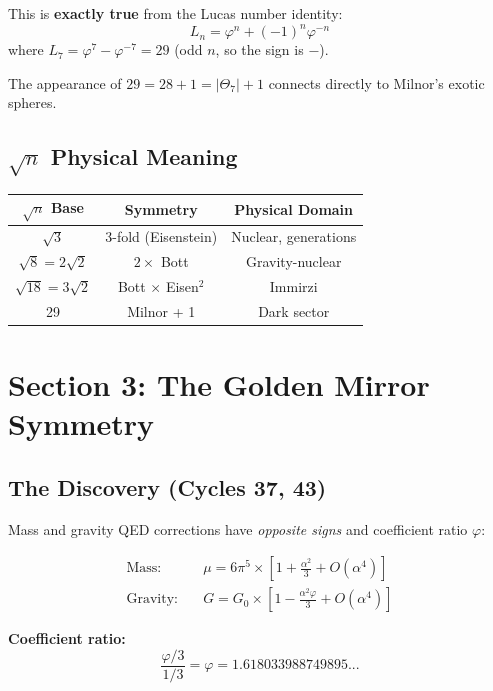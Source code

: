 \documentclass[aps,prd,twocolumn,superscriptaddress,floatfix,nofootinbib]{revtex4-2}
\theoremstyle{definition}
\theoremstyle{remark}
\newcommand{\vp}{\varphi}
\newcommand{\Th}{\Theta}
\begin{document}
This is \textbf{exactly true} from the Lucas number identity:
\begin{equation}
L_n = \vp^n + (-1)^n \vp^{-n}
\end{equation}
where $L_7 = \vp^7 - \vp^{-7} = 29$ (odd $n$, so the sign is $-$).

The appearance of $29 = 28 + 1 = |\Th_7| + 1$ connects directly to Milnor's exotic spheres.

\subsection{$\sqrt{n}$ Physical Meaning}

\begin{center}
\begin{tabular}{ccc}
\toprule
$\sqrt{n}$ Base & Symmetry & Physical Domain \\
\midrule
$\sqrt{3}$ & 3-fold (Eisenstein) & Nuclear, generations \\
$\sqrt{8} = 2\sqrt{2}$ & $2 \times$ Bott & Gravity-nuclear \\
$\sqrt{18} = 3\sqrt{2}$ & Bott $\times$ Eisen$^2$ & Immirzi \\
29 & Milnor + 1 & Dark sector \\
\bottomrule
\end{tabular}
\end{center}

\section{Section 3: The Golden Mirror Symmetry}

\subsection{The Discovery (Cycles 37, 43)}

Mass and gravity QED corrections have \textit{opposite signs} and coefficient ratio $\vp$:

\begin{align}
\text{Mass:} &\quad \mu = 6\pi^5 \times \left[1 + \frac{\alpha^2}{3} + O(\alpha^4)\right] \\
\text{Gravity:} &\quad G = G_0 \times \left[1 - \frac{\alpha^2 \vp}{3} + O(\alpha^4)\right]
\end{align}

\textbf{Coefficient ratio:}
\begin{equation}
\frac{\vp/3}{1/3} = \vp = 1.618033988749895...
\end{equation}
\end{document}
